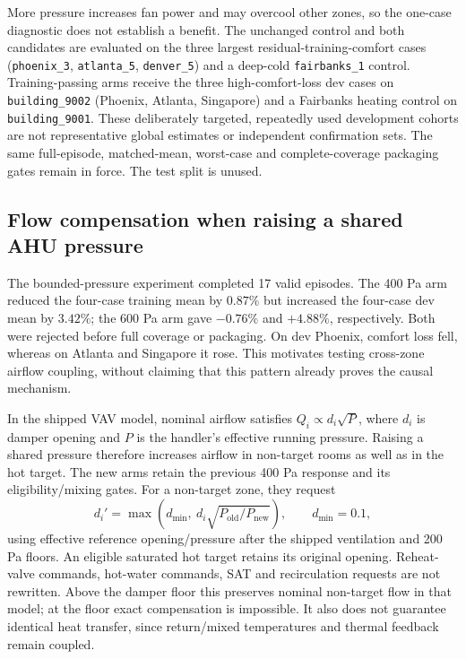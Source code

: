 More pressure increases fan power and may overcool other zones, so the
one-case diagnostic does not establish a benefit. The unchanged control and
both candidates are evaluated on the three largest residual-training-comfort
cases (\texttt{phoenix\_3}, \texttt{atlanta\_5}, \texttt{denver\_5}) and a
deep-cold \texttt{fairbanks\_1} control. Training-passing arms receive the
three high-comfort-loss dev cases on \texttt{building\_9002}
(Phoenix, Atlanta, Singapore) and a Fairbanks heating control on
\texttt{building\_9001}. These deliberately targeted, repeatedly used
development cohorts are not representative global estimates or independent
confirmation sets. The same full-episode, matched-mean, worst-case and
complete-coverage packaging gates remain in force. The test split is unused.



\subsection{Flow compensation when raising a shared AHU pressure}
The bounded-pressure experiment completed 17 valid episodes. The 400 Pa arm
reduced the four-case training mean by $0.87\%$ but increased the four-case dev
mean by $3.42\%$; the 600 Pa arm gave $-0.76\%$ and $+4.88\%$, respectively.
Both were rejected before full coverage or packaging. On dev Phoenix,
comfort loss fell, whereas on Atlanta and Singapore it rose. This motivates
testing cross-zone airflow coupling, without claiming that this pattern
already proves the causal mechanism.

In the shipped VAV model, nominal airflow satisfies
$Q_i\propto d_i\sqrt{P}$, where $d_i$ is damper opening and $P$ is the
handler's effective running pressure. Raising a shared pressure therefore
increases airflow in non-target rooms as well as in the hot target.
The new arms retain the previous 400 Pa response and its eligibility/mixing
gates. For a non-target zone, they request
\[
 d_i'=\max\!\left(d_{\min},\ d_i\sqrt{P_{\mathrm{old}}/P_{\mathrm{new}}}\right),
 \qquad d_{\min}=0.1,
\]
using effective reference opening/pressure after the shipped ventilation and
200 Pa floors. An eligible saturated hot target retains its original opening.
Reheat-valve commands, hot-water commands, SAT and recirculation requests are
not rewritten. Above the damper floor this preserves nominal non-target flow
in that model; at the floor exact compensation is impossible. It also does
not guarantee identical heat transfer, since return/mixed temperatures and
thermal feedback remain coupled.

